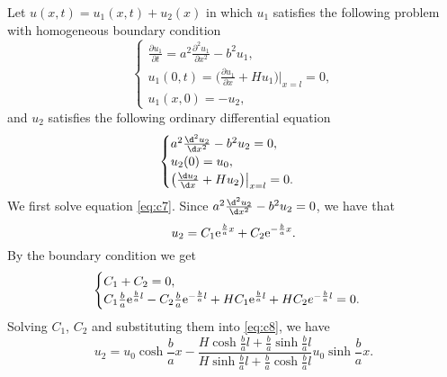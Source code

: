 \begin{solution}
    Let $u(x,t) = u_1(x,t) + u_2(x)$ in which $u_1$ satisfies the following 
    problem with homogeneous boundary condition
    \begin{equation}\label{eq:c6}
      \begin{cases}
        \frac{\partial u_1}{\partial t} = a^2 \frac{\partial^2 u_1}{\partial x^2} - b^2u_1, \\
        u_1(0,t) = \bigl(\frac{\partial u_1}{\partial x} + Hu_1\bigr)\big|_{x=l} = 0, \\
        u_1(x,0) = -u_2,
      \end{cases}
    \end{equation}
    and $u_2$ satisfies the following ordinary differential equation
    \begin{equation}\label{eq:c7}
      \begin{cases}
        a^2 \frac{\d^2 u_2}{\d x^2} - b^2 u_2 = 0, \\
        u_2(0) = u_0, \\
        \bigl(\frac{\d u_2}{\d x} + Hu_2\bigr)\big|_{x=l} = 0.
      \end{cases}
    \end{equation}
    We first solve equation \eqref{eq:c7}. Since $a^2 \frac{\d^2 u_2}{\d x^2} - b^2 u_2 = 0$,
    we have that
    \begin{equation}\label{eq:c8}
      u_2 = C_1 \mathrm{e}^{\frac{b}{a}x} + C_2 \mathrm{e}^{-\frac{b}{a}x}.
    \end{equation}
    By the boundary condition we get
    \[\begin{cases}
      C_1 + C_2 = 0, \\
      C_1\frac{b}{a}\mathrm{e}^{\frac{b}{a}l} - C_2 \frac{b}{a} \mathrm{e}^{-\frac{b}{a}l}
        + H C_1 \mathrm{e}^{\frac{b}{a}l} + H C_2 e^{-\frac{b}{a}l} = 0.
    \end{cases}\]
    Solving $C_1$, $C_2$ and substituting them into \eqref{eq:c8}, we have
    \begin{equation}\label{eq:c9}
      u_2 = u_0 \cosh \frac{b}{a}x - \frac{H\cosh\frac{b}{a}l + \frac{b}{a}\sinh\frac{b}{a}l}
        {H\sinh\frac{b}{a}l + \frac{b}{a}\cosh\frac{b}{a}l}
        u_0 \sinh\frac{b}{a}x.
    \end{equation}


\end{solution}
